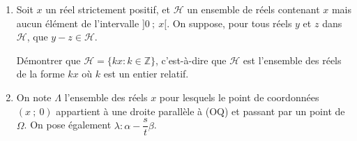 \documentclass[landscape,twocolumn,leqno,a4paper,10pt]{report} %
\renewcommand{\epsilon}{\varepsilon}		%
\newcommand\Z{\mathbb{Z}}
\begin{document}
\begin{enumerate}[resume]
\begin{enumerate}
On note Q un point ainsi obtenu lorsque $\epsilon = \dfrac{\text{min}\{\alpha~;~\beta\}}{2}$ et et $(s~;~t)$ ses coordonnées. Pour tout point de coordonnées $(x~;~y)$, on note désormais $g$(P) la quantité : $\dfrac xs - \dfrac yt$.
		\item Démontrer que, pour tout entier relatif $k$, le rectangle $]ks~;~ (k + 2)s] \times ]kt~;~ (k - 2)t]$ ne contient aucun point de $\Omega$.
		\item Démontrer que $\Omega$ ne contient aucun point P tel que $1 < g(P)\leqslant  2$.
		\item Démontrer que tout point P de $\Omega$ tel que $|g(\text{P})| \leqslant 2$ appartient à la droite (OQ).
		\item Démontrer que, pour tout réel $\epsilon > 0$, il existe un point qui appartient à la fois à la droite (OQ), au rectangle $]0~;~\epsilon[ \times ] -\epsilon~;~0[$ et à l'ensemble $\Omega$.
		\item Démontrer que toute droite parallèle à (OQ) et passant par un point du rectangle $]0~;~\alpha[ \times [ \times ]0~;~\beta[$ ne contient aucun point de $\Omega$.
	\end{enumerate}
\item%
Soit $x$ un réel strictement positif, et $\mathcal{H}$ un ensemble de réels contenant $x$ mais aucun élément de l'intervalle ]$0~;~x[$. On suppose, pour tous réels $y$ et $z$ dans $\mathcal{H}$, que $y - z \in \mathcal{H}$.

Démontrer que $\mathcal{H} = \{kx : k \in \Z\}$, c'est-à-dire que $\mathcal{H}$ est l'ensemble des réels de la forme $kx$ où $k$ est un entier relatif.

\item %
On note $\Lambda$ l'ensemble des réels $x$ pour lesquels le point de coordonnées $(x~;~0)$ appartient à une droite parallèle à (OQ) et passant par un point de $\Omega$. On pose également $\lambda : \alpha - \dfrac st \beta$.


\end{enumerate}
\end{document}
